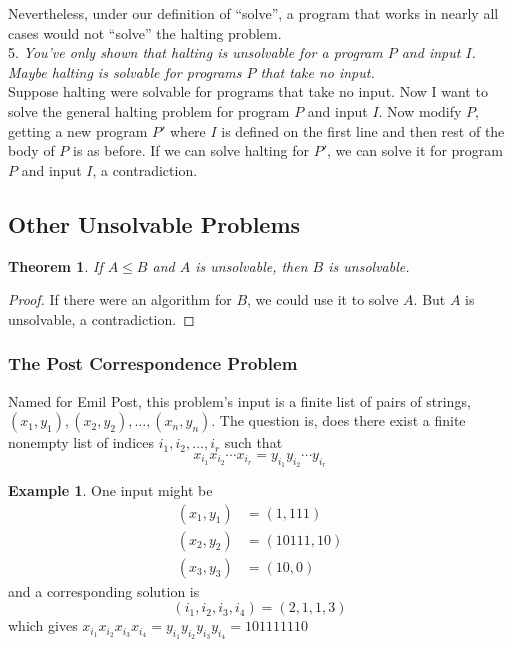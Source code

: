 \documentclass[12pt]{article}
\theoremstyle{plain}
\newtheorem{theorem}{Theorem}[subsection]
\theoremstyle{definition}
\newtheorem*{ex*}{Example}
\begin{document}
Nevertheless, under our definition of ``solve'', a program that works in nearly all cases would not ``solve'' the halting problem. \\

5. \emph{You've only shown that halting is unsolvable for a program $P$ and input $I$. Maybe halting is solvable for programs $P$ that take no input.} \\

Suppose halting were solvable for programs that take no input.
Now I want to solve the general halting problem for program $P$ and input $I$.
Now modify $P$, getting a new program $P'$ where $I$ is defined on the first line and then rest of the body of $P$ is as before.
If we can solve halting for $P'$, we can solve it for program $P$ and input $I$, a contradiction.

\subsection{Other Unsolvable Problems}
\begin{theorem}
If $A \leq B$ and $A$ is unsolvable, then $B$ is unsolvable.
\end{theorem}
\begin{proof}
If there were an algorithm for $B$, we could use it to solve $A$.
But $A$ is unsolvable, a contradiction.
\end{proof}

\subsubsection{The Post Correspondence Problem}
Named for Emil Post, this problem's input is a finite list of pairs of strings, $(x_{1}, y_{1}), (x_{2}, y_{2}), \dots, (x_{n}, y_{n})$.
The question is, does there exist a finite nonempty list of indices $i_{1}, i_{2}, \dots, i_{r}$ such that
$$x_{i_{1}}x_{i_{2}} \cdots x_{i_{r}} = y_{i_{1}}y_{i_{2}} \cdots y_{i_{r}}$$

\begin{ex*}
One input might be
\begin{align*}
(x_{1}, y_{1}) &= (1, 111) \\
(x_{2}, y_{2}) &= (10111, 10) \\
(x_{3}, y_{3}) &= (10, 0)
\end{align*}
and a corresponding solution is
$$(i_{1}, i_{2}, i_{3}, i_{4}) = (2, 1, 1, 3)$$
which gives $x_{i_{1}}x_{i_{2}}x_{i_{3}}x_{i_{4}} = y_{i_{1}}y_{i_{2}}y_{i_{3}}y_{i_{4}} = 101111110$
\end{ex*}
\end{document}
